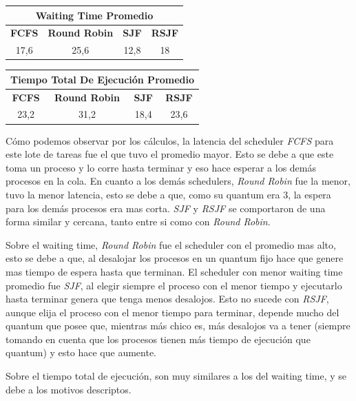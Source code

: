 \begin{center}
	\begin{tabular}{|c|c|c|c|}
		\hline
		\multicolumn{4}{|c|}{\large{\textbf{Waiting Time Promedio}}} \\
		\hline
		\textbf{FCFS} & \textbf{Round Robin} & \textbf{SJF} & \textbf{RSJF} \\
		\hline
		17,6 & 25,6 & 12,8 & 18 \\
		\hline
	\end{tabular}
\end{center}

\begin{center}
	\begin{tabular}{|c|c|c|c|}
		\hline
		\multicolumn{4}{|c|}{\large{\textbf{Tiempo Total De Ejecución Promedio}}} \\
		\hline
		\textbf{FCFS} & \textbf{Round Robin} & \textbf{SJF} & \textbf{RSJF} \\
		\hline
		23,2 & 31,2 & 18,4 & 23,6 \\
		\hline
	\end{tabular}
\end{center}

Cómo podemos observar por los cálculos, la latencia del scheduler \emph{FCFS} para este lote de tareas fue el que tuvo el promedio mayor. Esto se debe a que este toma un proceso y lo corre hasta terminar y eso hace esperar a los demás procesos en la cola. En cuanto a los demás schedulers, \emph{Round Robin} fue la menor, tuvo la menor latencia, esto se debe a que, como su quantum era 3, la espera para los demás procesos era mas corta. \emph{SJF} y \emph{RSJF} se comportaron de una forma similar y cercana, tanto entre si como con \emph{Round Robin}.

Sobre el waiting time, \emph{Round Robin} fue el scheduler con el promedio mas alto, esto se debe a que, al desalojar los procesos en un quantum fijo hace que genere mas tiempo de espera hasta que terminan. El scheduler con menor waiting time promedio fue \emph{SJF}, al elegir siempre el proceso con el menor tiempo y ejecutarlo hasta terminar genera que tenga menos desalojos. Esto no sucede con \emph{RSJF}, aunque elija el proceso con el menor tiempo para terminar, depende mucho del quantum que posee que, mientras más chico es, más desalojos va a tener (siempre tomando en cuenta que los procesos tienen más tiempo de ejecución que quantum) y esto hace que aumente.

Sobre el tiempo total de ejecución, son muy similares a los del waiting time, y se debe a los motivos descriptos.

